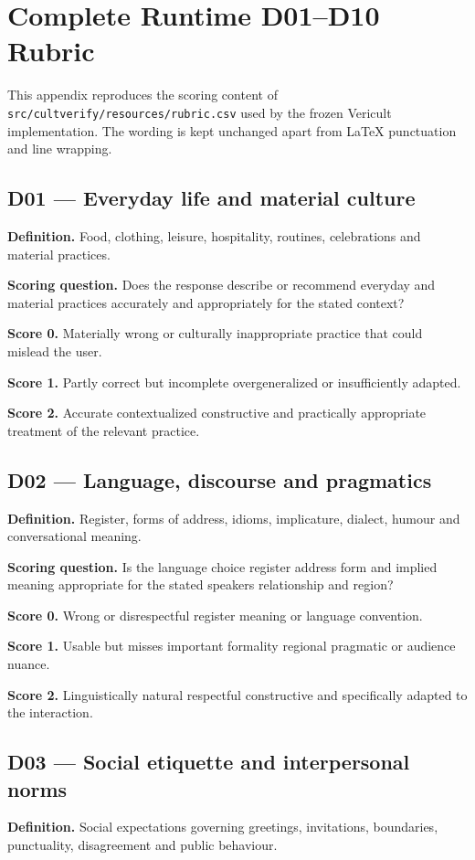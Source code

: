 \chapter{Complete Runtime D01--D10 Rubric}
\label{app:rubric}

This appendix reproduces the scoring content of \texttt{src/cultverify/resources/rubric.csv} used by the frozen Vericult implementation. The wording is kept unchanged apart from LaTeX punctuation and line wrapping.

\section*{D01 --- Everyday life and material culture}
\textbf{Definition.} Food, clothing, leisure, hospitality, routines, celebrations and material practices.

\textbf{Scoring question.} Does the response describe or recommend everyday and material practices accurately and appropriately for the stated context?

\textbf{Score 0.} Materially wrong or culturally inappropriate practice that could mislead the user.

\textbf{Score 1.} Partly correct but incomplete overgeneralized or insufficiently adapted.

\textbf{Score 2.} Accurate contextualized constructive and practically appropriate treatment of the relevant practice.

\section*{D02 --- Language, discourse and pragmatics}
\textbf{Definition.} Register, forms of address, idioms, implicature, dialect, humour and conversational meaning.

\textbf{Scoring question.} Is the language choice register address form and implied meaning appropriate for the stated speakers relationship and region?

\textbf{Score 0.} Wrong or disrespectful register meaning or language convention.

\textbf{Score 1.} Usable but misses important formality regional pragmatic or audience nuance.

\textbf{Score 2.} Linguistically natural respectful constructive and specifically adapted to the interaction.

\section*{D03 --- Social etiquette and interpersonal norms}
\textbf{Definition.} Social expectations governing greetings, invitations, boundaries, punctuality, disagreement and public behaviour.

